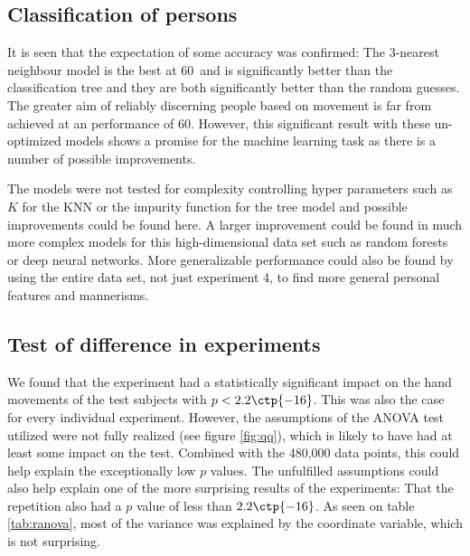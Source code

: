 \documentclass[11pt,fleqn]{article}
\begin{document}
\subsection{Classification of persons}
It is seen that the expectation of some accuracy was confirmed: The 3-nearest neighbour model is the best at 60\pro\ and is significantly better than the classification tree and they are both significantly better than the random guesses. The greater aim of reliably discerning people based on movement is far from achieved at an performance of 60\pro. However, this significant result with these un-optimized models shows a promise for the machine learning task as there is a number of possible improvements. 



The models were not tested for complexity controlling hyper parameters such as \(K\) for the KNN or the impurity function for the tree model and possible improvements could be found here. A larger improvement could be found in much more complex models for this high-dimensional data set such as random forests or deep neural networks. More generalizable performance could also be found by using the entire data set, not just experiment 4, to find more general personal  features and mannerisms.

\subsection{Test of difference in experiments}
We found that the experiment had a statistically significant impact on the hand movements of the test subjects with $ p<2.2\ctp{-16} $.
This was also the case for every individual experiment.
However, the assumptions of the ANOVA test utilized were not fully realized (see figure \ref{fig:qq}), which is likely to have had at least some impact on the test.
Combined with the 480,000 data points, this could help explain the exceptionally low $ p $ values.
The unfulfilled assumptions could also help explain one of the more surprising results of the experiments: That the repetition also had a $ p $ value of less than $ 2.2\ctp{-16} $.
As seen on table \ref{tab:ranova}, most of the variance was explained by the coordinate variable, which is not surprising.
\end{document}
